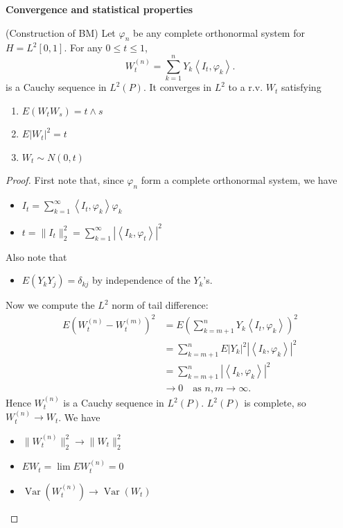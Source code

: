 \textbf{Convergence and statistical properties}
\begin{lemma}(Construction of BM)
	\label{lem:BMConstructConverge}
	Let $\varphi_n$ be any complete orthonormal system for $H = L^2[0,1]$.
	For any $0 \le t \le 1$, 
	\[
	W_t^{(n)} = \sum_{k=1}^{n} Y_k \left\langle I_t, \varphi_k \right\rangle 
.\] 
is a Cauchy sequence in  $L^2(P)$. It converges in $L^2$ to a r.v. $W_t$ satisfying
	\begin{enumerate}
		\item $E\left( W_t W_s \right)  = t \wedge s$
		\item $E\left| W_t \right| ^2 = t$ 
		\item $W_t \sim N(0,t)$
	\end{enumerate}
\end{lemma}
\begin{proof}
	First note that, since $\varphi_n$ form a complete orthonormal system, we have
	\begin{itemize}
		\item $I_t = \sum_{k=1}^{\infty} \left\langle I_t, \varphi_k \right\rangle \varphi_k$
		\item $t = \|I_t\|_2^2 = \sum_{k=1}^{\infty} \left| \left\langle I_k, \varphi_t \right\rangle  \right| ^2$
	\end{itemize}
	Also note that
	\begin{itemize}
		\item  $E(Y_k Y_j) = \delta_{kj}$ by independence of the $Y_k$'s.
	\end{itemize}
	Now we compute the $L^2$ norm of tail difference:
	\begin{align*}
		E\left( W_t^{(n)} - W_t^{(m)} \right) ^2
		&= E\left( \sum_{k=m+1}^{n} Y_k \left\langle I_t, \varphi_k \right\rangle  \right) ^2 \\
		&= \sum_{k=m+1}^{n} E|Y_k|^2 \left| \left\langle I_k, \varphi_k \right\rangle  \right| ^2 \\
		&= \sum_{k=m+1}^{n} \left| \left\langle I_k, \varphi_k \right\rangle  \right| ^2 \\
		& \to 0 \quad \text{as } n, m \to \infty
	.\end{align*}
	Hence $W_t^{(n)}$ is a Cauchy sequence in $L^2(P)$. $L^2(P)$ is complete, so $W_t^{(n)} \to  W_t$. We have
	\begin{itemize}
		\item $\|W_t^{(n)}\|_2^2 \to  \|W_t\|_2^2$
		\item $E W_t = \lim E W_t^{(n)} = 0$ 
		\item $\operatorname{Var} (W_t^{(n)}) \to \operatorname{Var} (W_t)$

\end{itemize}
\end{proof}
